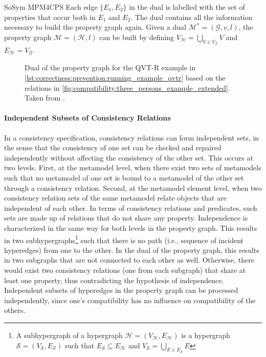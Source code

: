 \begin{copiedFrom}{SoSym MPM4CPS}
Each edge $\{E_1, E_2\}$ in the dual is labelled with the set of properties that occur both in $E_1$ and $E_2$. The dual contains all the information necessary to build the property graph again. Given a dual $\mathcal{M^{*}} = (\mathcal{G}, v, l)$, the property graph $\mathcal{M} = (\mathcal{H}, l)$ can be built by defining $V_{\mathcal{H}} = \bigcup_{V \in V_{\mathcal{G}}} V$ and $E_{\mathcal{H}} = V_{\mathcal{G}}$. 

\begin{figure}
    \centering
    \resizebox{0.8\linewidth}{!}{}
    \resizebox{\linewidth}{!}{}
    \caption{Dual of the property graph for the QVT-R example in \autoref{lst:correctness:prevention:running_example_qvtr} based on the relations in \autoref{fig:compatibility:three_persons_example_extended}. Taken from .}
    \label{fig:correctness:prevention:dual_propertygraph_re}
\end{figure}

\paragraph{Independent Subsets of Consistency Relations}
In a consistency specification, consistency relations can form independent sets, in the sense that the consistency of one set can be checked and repaired independently without affecting the consistency of the other set. This occurs at two levels. 
First, at the metamodel level, when there exist two sets of metamodels such that no metamodel of one set is bound to a metamodel of the other set through a consistency relation. 
Second, at the metamodel element level, when two consistency relation sets of the same metamodel relate objects that are independent of each other. In terms of consistency relations and predicates, such sets are made up of relations that do not share any property.
Independence is characterized in the same way for both levels in the property graph. This results in two subhypergraphs\footnote{A subhypergraph of a hypergraph $\mathcal{H} = (V_{\mathcal{H}}, E_{\mathcal{H}})$ is a hypergraph $\mathcal{S} = (V_{\mathcal{S}}, E_{\mathcal{S}})$ such that $E_{\mathcal{S}} \subseteq E_{\mathcal{H}}$ and $V_{\mathcal{S}} = \bigcup_{E \in E_{\mathcal{S}}} E$} such that there is no path (i.e., sequence of incident hyperedges) from one to the other.
In the dual of the property graph, this results in two subgraphs that are not connected to each other as well. Otherwise, there would exist two consistency relations (one from each subgraph) that share at least one property, thus contradicting the hypothesis of independence. Independent subsets of hyperedges in the property graph can be processed independently, since one's compatibility has no influence on compatibility of the others.


\end{copiedFrom}
